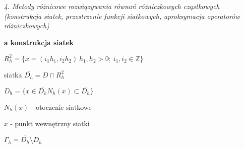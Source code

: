 \textit{4. Metody różnicowe rozwiązywania równań różniczkowych cząstkowych (konstrukcja siatek, przestrzenie funkcji siatkowych, aproksymacja operatorów różniczkowych)}

\textbf{a\) konstrukcja siatek}

$R^{2}_{h} = \{ x = (i_{1}h_{1}, i_{2}h_{2})\ h_{1},h_{2} > 0;\ i_{1},i_{2} \in \mathbb{Z}\}$

siatka $\bar{D_{h}} = D \cap R^{2}_{h}$

$D_{h} = \{ x \in \bar{D_{h}} N_h(x) \subset \bar{D_{h}}\}$

$N_h(x)$ - otoczenie siatkowe

$x$ - punkt wewnętrzny siatki

$\Gamma_h = \bar{D_h} \setminus D_h$